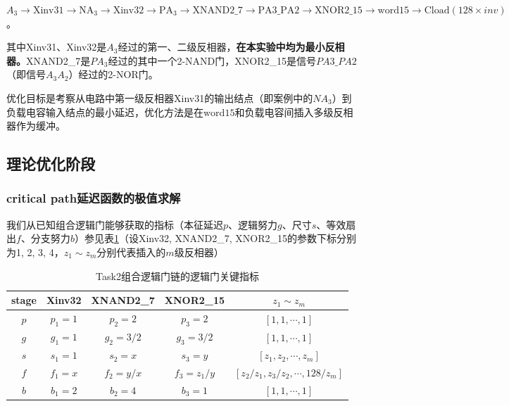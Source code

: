 \documentclass[UTF8,12pt,a4paper]{ctexart}
\begin{document}
$A_3 \rightarrow \text{Xinv31} \rightarrow \text{NA}_3 \rightarrow \text{Xinv32} \rightarrow \text{PA}_3 \rightarrow \text{XNAND2\_7} \rightarrow \text{PA3\_PA2} \rightarrow \text{XNOR2\_15} \rightarrow \text{word}15 \rightarrow \text{Cload}(128\times{inv})$。

其中Xinv31、Xinv32是$A_3$经过的第一、二级反相器，\textbf{在本实验中均为最小反相器。}XNAND2\_7是$PA_3$经过的其中一个2-NAND门，XNOR2\_15是信号$PA3\_PA2$（即信号$A_{3}A_{2}$）经过的2-NOR门。

优化目标是考察从电路中第一级反相器Xinv31的输出结点（即案例中的$NA_3$）到负载电容输入结点的最小延迟，优化方法是在$\text{word}15$和负载电容间插入多级反相器作为缓冲。

\subsection{理论优化阶段}

\subsubsection{critical path延迟函数的极值求解}

我们从已知组合逻辑门能够获取的指标（本征延迟$p$、逻辑努力$g$、尺寸$s$、等效扇出$f$、分支努力$b$）参见表\ref{tab:task2_metrics}（设Xinv32, XNAND2\_7, XNOR2\_15的参数下标分别为1, 2, 3, 4，$z_1 \sim z_m$分别代表插入的$m$级反相器）

\begin{table}[htbp]
    \centering
    \caption{Task2组合逻辑门链的逻辑门关键指标}
    \label{tab:task2_metrics}
    \begin{tabular}{ccccc}
    \toprule
    stage & Xinv32 & XNAND2\_7 & XNOR2\_15 & $z_1 \sim z_m$ \\
    \midrule
    $p$ & $p_1 = 1$ & $p_2 = 2$ & $p_3 = 2$ & $[1,1,\cdots ,1]$ \\
    $g$ & $g_1 = 1$ & $g_2 = 3/2$ & $g_3 = 3/2$ & $[1,1,\cdots ,1]$ \\
    $s$ & $s_1 = 1$ & $s_2 = x$ & $s_3 = y$ & $[z_1, z_2, \cdots, z_m]$ \\
    $f$ & $f_1 = x$ & $f_2 = y/x$ & $f_3 = z_{1}/y$ & $[z_{2}/z_{1}, z_{3}/z_{2}, \cdots, 128/z_{m}]$ \\
    $b$ & $b_1 = 2$ & $b_2 = 4$ & $b_3 = 1$ & $[1,1,\cdots ,1]$ \\
    \bottomrule
    \end{tabular}
\end{table}
\end{document}
